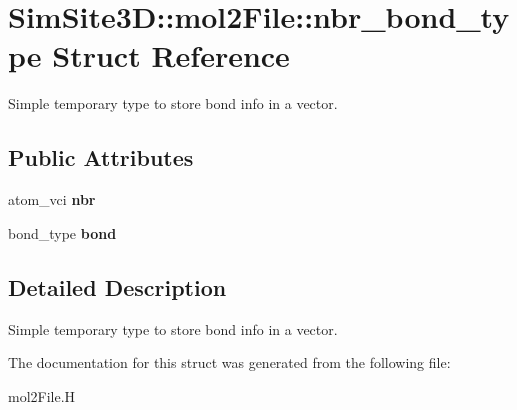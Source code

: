 \section{SimSite3D::mol2File::nbr\_\-bond\_\-type Struct Reference}
\label{structSimSite3D_1_1mol2File_1_1nbr__bond__type}
Simple temporary type to store bond info in a vector.  


\subsection*{Public Attributes}
\begin{CompactItemize}
\item 
atom\_\-vci \textbf{nbr}\label{structSimSite3D_1_1mol2File_1_1nbr__bond__type_a83f213d22c3c323abc1c4e0ea6dcd7c}

\item 
bond\_\-type \textbf{bond}\label{structSimSite3D_1_1mol2File_1_1nbr__bond__type_4ddb744e4eed89b40973c55f398addf1}

\end{CompactItemize}


\subsection{Detailed Description}
Simple temporary type to store bond info in a vector. 



The documentation for this struct was generated from the following file:\begin{CompactItemize}
\item 
mol2File.H\end{CompactItemize}
